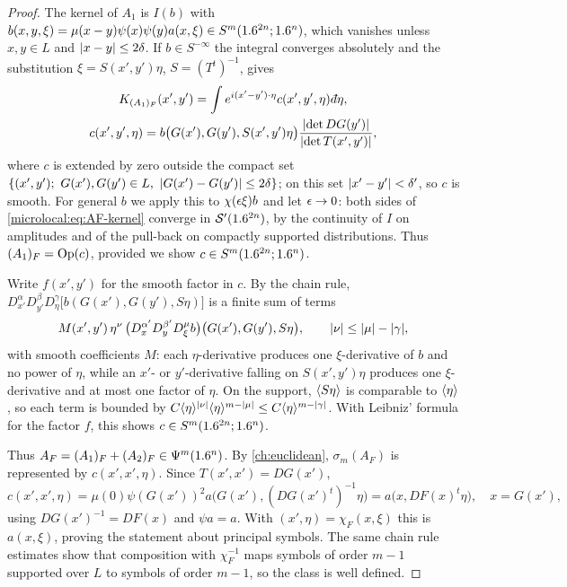 \begin{proof}
  The kernel of $A_1$ is $I(b)$ with
  $b(x,y,\xi)=\mu(x-y)\psi(x)\psi(y)a(x,\xi)\in S^m(1.6^{2n};1.6^n)$, which
  vanishes unless $x,y\in L$ and $\lvert x-y\rvert\le2\delta$. If $b\in
  S^{-\infty}$ the integral converges absolutely and the substitution
  $\xi=S(x',y')\eta$, $S=(T^t)^{-1}$, gives
  \begin{equation}\label{microlocal:eq:AF-kernel}
  \begin{gathered}
    K_{(A_1)_F}(x',y')=\int e^{i(x'-y')\cdot\eta}c(x',y',\eta)\,\dbar\eta,\\
    c(x',y',\eta)=b\bigl(G(x'),G(y'),S(x',y')\eta\bigr)
    \frac{\abs{\det DG(y')}}{\abs{\det T(x',y')}},
  \end{gathered}
  \end{equation}
  where $c$ is extended by zero outside the compact set
  $\{(x',y');\ G(x'),G(y')\in L,\ \abs{G(x')-G(y')}\le2\delta\}$; on this set
  $\lvert x'-y'\rvert<\delta'$, so $c$ is smooth. For general $b$ we apply this to
  $\chi(\epsilon\xi)b$ and let $\epsilon\to0$: both sides of
  \eqref{microlocal:eq:AF-kernel} converge in $\mathcal{S}'(1.6^{2n})$, by the
  continuity of $I$ on amplitudes and of the pull-back on compactly supported
  distributions. Thus $(A_1)_F=\operatorname{Op}(c)$, provided we show $c\in
  S^m(1.6^{2n};1.6^n)$.

  Write $f(x',y')$ for the smooth factor in $c$. By the chain rule,
  $D^\alpha_{x'}D^\beta_{y'}D^\gamma_\eta\bigl[b(G(x'),G(y'),S\eta)\bigr]$ is
  a finite sum of terms
  \begin{equation*}
    M(x',y')\,\eta^\nu\,
    \bigl(D^{\alpha'}_xD^{\beta'}_yD^\mu_\xi b\bigr)\bigl(G(x'),G(y'),S\eta\bigr),
    \qquad\lvert \nu\rvert\le\lvert \mu\rvert-\lvert \gamma\rvert,
  \end{equation*}
  with smooth coefficients $M$: each $\eta$-derivative produces one
  $\xi$-derivative of $b$ and no power of $\eta$, while an $x'$- or
  $y'$-derivative falling on $S(x',y')\eta$ produces one $\xi$-derivative and
  at most one factor of $\eta$. On the support, $\langle S\eta\rangle$ is comparable
  to $\langle \eta\rangle$, so each term is bounded by
  $C\langle \eta\rangle^{\lvert \nu\rvert}\langle \eta\rangle^{m-\lvert \mu\rvert}\le C\langle \eta\rangle^{m-\lvert \gamma\rvert}$. With
  Leibniz' formula for the factor $f$, this shows $c\in S^m(1.6^{2n};1.6^n)$.

  Thus $A_F=(A_1)_F+(A_2)_F\in\Psi^{m}(1.6^n)$. By
  \cref{ch:euclidean}, $\sigma_m(A_F)$ is represented by
  $c(x',x',\eta)$. Since $T(x',x')=DG(x')$,
  \begin{equation*}
    c(x',x',\eta)=\mu(0)\psi(G(x'))^2a\bigl(G(x'),(DG(x')^t)^{-1}\eta\bigr)
    =a\bigl(x,DF(x)^t\eta\bigr),\quad x=G(x'),
  \end{equation*}
  using $DG(x')^{-1}=DF(x)$ and $\psi a=a$. With $(x',\eta)=\chi_F(x,\xi)$ this
  is $a(x,\xi)$, proving the statement about principal symbols. The same
  chain rule estimates show that composition with $\chi_F^{-1}$ maps symbols
  of order $m-1$ supported over $L$ to symbols of order $m-1$, so the class
  is well defined.


\end{proof}
